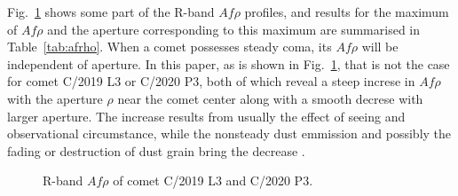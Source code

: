 Fig.~\ref{fig:Afrho} shows some part of the R-band $Af\rho$ profiles, and results for the maximum of $Af\rho$ and the aperture corresponding to this maximum are summarised in Table~\ref{tab:afrho}. When a comet possesses steady coma, its $Af\rho$ will be independent of aperture. In this paper, as is shown in Fig.~\ref{fig:Afrho}, that is not the case for comet C/2019 L3 or C/2020 P3, both of which reveal a steep increse in $Af\rho$ with the aperture $\rho$ near the comet center along with a smooth decrese with larger aperture. The increase results from usually the effect of seeing and observational circumstance, while the nonsteady dust emmission and possibly the fading or destruction of dust grain bring the decrease \citep{lara_behaviour_2003,tozzi_imaging_2003}.  
             


\begin{figure}
    \centering

    \caption{R-band $Af\rho$ of comet C/2019 L3 and C/2020 P3. }
    \label{fig:Afrho}
\end{figure}

